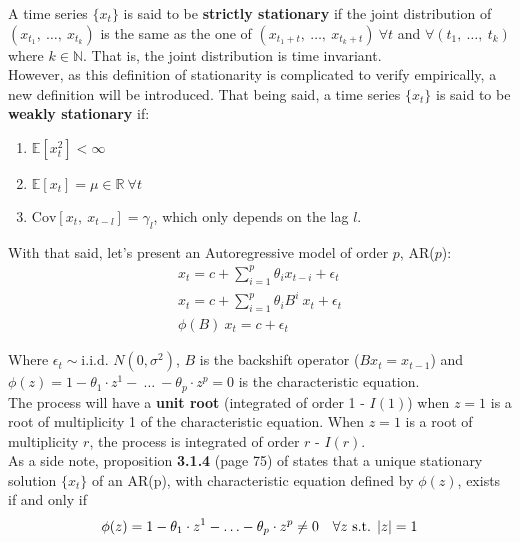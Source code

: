 \documentclass[a4paper]{report}
\begin{document}
A time series $\{x_t\}$ is said to be \textbf{strictly stationary} 
\cite{beran2018mathematical} if the joint distribution of $(x_{t_1},\ \ldots 
,\ x_{t_k})$ is the same as the one of $(x_{t_1 + t},\ \ldots ,\ x_{t_k + 
t})\ \forall t$ and $\forall (t_1,\ \ldots,\ t_k)$ where $k \in \mathbb{N}$. 
That is, the joint distribution is time invariant.\\

However, as this definition of stationarity is complicated to verify 
empirically, a new definition will be introduced. That being said, a time 
series $\{ x_t \}$ is said to be \textbf{weakly stationary}
\cite{beran2018mathematical} if:

\begin{enumerate}
	\item $\mathbb{E}[x_t^2] < \infty$
	\item $\mathbb{E}[x_t] = \mu \in \mathbb{R} \ \forall t$
	\item $\text{Cov}[x_t,\ x_{t-l}] = \gamma_{l}$, which 
	only depends on the lag $l$.
\end{enumerate}

With that said, let's present an Autoregressive model of order $p$, AR($p$):
\begin{align*}
	x_t = c + \sum_{i = 1}^{p} \theta_i x_{t-i} + \epsilon_t\\
	x_t = c + \sum_{i = 1}^{p} \theta_i B^i \ x_{t} + 
	\epsilon_t\\
	\phi(B) \ x_t = c + \epsilon_t 
\end{align*}

Where $\epsilon_t \sim \text{i.i.d. } N(0,\sigma^2)$, $B$ is the backshift 
operator ($B x_t = x_{t-1}$) and $\phi(z) = 1 - \theta_1 \cdot z^1 -\ \ldots 
\ - \theta_p \cdot z^p = 0$ is the characteristic equation.\\

The process will have a \textbf{unit root} (integrated of order 1 - $I(1)$) 
when $z = 1$ is a root of multiplicity 1 of the characteristic equation. When 
$z = 1$ is a root of multiplicity $r$, the process is integrated of order 
$r$ - $I(r)$.\\

As a side note, proposition \textbf{3.1.4} (page 75) of 
\cite{brockwell2016introduction} states that a unique stationary solution 
$\{ x_t \}$ of an AR(p), with characteristic equation defined by $\phi(z)$, 
exists if and only if 
\begin{equation*}
\phi(z) = 1 - \theta_1 \cdot z^1 - \ldots - \theta_p \cdot z^p \neq 0 
\hspace{.35cm}
\forall z \text{ s.t. } |z| = 1
\end{equation*}
\end{document}
